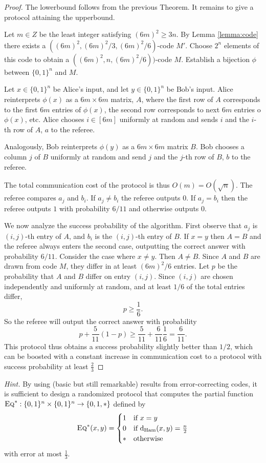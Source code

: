 \documentclass[11pt]{amsart}
\theoremstyle{plain}
\theoremstyle{definition}
\theoremstyle{plain}
\newcommand{\dHam}{\mathrm{d}_{\mathrm{Ham}}}
\newcommand{\Eq}{\textsc{Eq}}
\begin{document}
\begin{proof}
The lowerbound follows from the previous Theorem. It remains to give a protocol attaining the upperbound.

Let $m \in Z$ be the least integer satisfying $(6m)^2 \geq 3n$. By Lemma \ref{lemma:code} there exists a $((6m)^2, (6m)^2/3, (6m)^2/6)$-code $M'$. Choose $2^n$ elements of this code to obtain a $((6m)^2,n, (6m)^2/6))$-code $M$. Establish a bijection $\phi$ between $\{0,1\}^n$ and $M$.

Let $x \in\{0,1\}^n$ be Alice's input, and let $y \in \{0,1\}^n$ be Bob's input. Alice reinterprets $\phi(x)$ as a $6m\times 6m$ matrix, $A$, where the first row of $A$ corresponds to the first $6m$ entries of $\phi(x)$, the second row corresponds to next $6m$ entries o $\phi(x)$, etc. Alice chooses $i \in [6m]$ uniformly at random and sends $i$ and the $i$-th row of $A$, $a$ to the referee.

Analogously, Bob reinterprets $\phi(y)$ as a $6m\times 6m$ matrix $B$. Bob chooses a column $j$ of $B$ uniformly at random and send $j$ and the $j$-th row of $B$, $b$ to the referee.

The total communication cost of the protocol is thus $O(m) = O(\sqrt{n})$. The referee compares $a_j$ and $b_i$. If $a_j \neq b_i$ the referee outputs $0$. If $a_j = b_i$ then the referee outputs $1$ with probability $6/11$ and otherwise outputs $0$.

We now analyze the success probability of the algorithm. First observe that $a_j$ is $(i,j)$-th entry of $A$, and $b_i$ is the $(i,j)$-th entry of $B$. If $x=y$ then $A=B$ and the referee always enters the second case, outputting the correct answer with probability $6/11$. Consider the case where $x\neq y$. Then $A\neq B$. Since $A$ and $B$ are drawn from code $M$, they differ in at least $(6m)^2/6$ entries. Let $p$ be the probability that $A$ and $B$ differ on entry $(i,j)$. Since $(i,j)$ are chosen independently and uniformly at random, and at least $1/6$ of the total entries differ, 
$$p\geq \frac{1}{6}.$$
So the referee will output the correct answer with probability
$$p + \frac{5}{11}(1-p) \geq \frac{5}{11} + \frac{6}{11}\frac{1}{6} = \frac{6}{11}.$$
This protocol thus obtains a success probability slightly better than $1/2$, which can be boosted with a constant increase in communication cost to a protocol with success probability at least $\frac{2}{3}$
\end{proof}

\bigskip
\noindent \emph{Hint.} By using (basic but still remarkable) results from error-correcting codes, it is sufficient to design a randomized protocol that computes the partial function $\Eq^* : \{0,1\}^n \times \{0,1\}^n \to \{0,1,*\}$ defined by
\[
\Eq^*(x,y) = \begin{cases}
1 & \mbox{if } x = y \\
0 & \mbox{if } \dHam(x,y) = \frac n2 \\
* & \mbox{otherwise}
\end{cases}
\]
with error at most $\frac13$.
\end{document}
